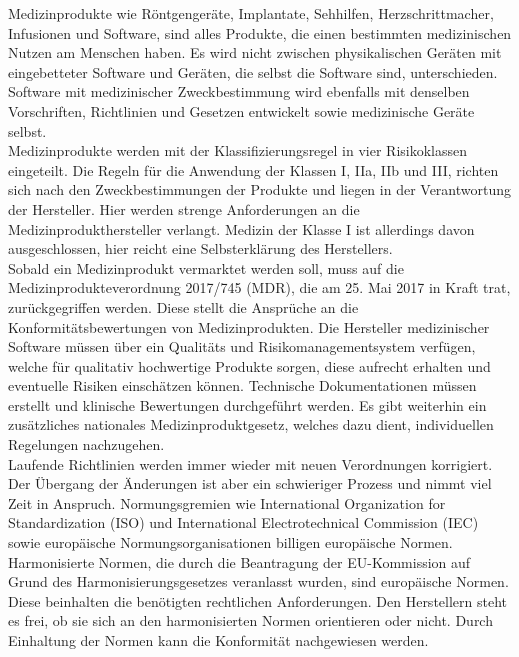 Medizinprodukte wie Röntgengeräte, Implantate, Sehhilfen, Herzschrittmacher, 
Infusionen und Software, sind alles Produkte, die einen bestimmten medizinischen Nutzen am Menschen haben.
Es wird nicht zwischen physikalischen Geräten mit eingebetteter Software und Geräten, die selbst die Software sind, unterschieden. 
Software mit medizinischer Zweckbestimmung wird ebenfalls mit denselben Vorschriften, Richtlinien und Gesetzen entwickelt sowie medizinische Geräte selbst.\cite{AI_in_EU}\\
Medizinprodukte werden mit der Klassifizierungsregel in vier Risikoklassen eingeteilt. 
Die Regeln für die Anwendung der Klassen I, IIa, IIb und III, 
richten sich nach den Zweckbestimmungen der Produkte und liegen in der Verantwortung der Hersteller. Hier werden strenge Anforderungen an die Medizinprodukthersteller verlangt. 
Medizin der Klasse I ist allerdings davon ausgeschlossen, hier reicht eine Selbsterklärung des Herstellers.\\
Sobald ein Medizinprodukt vermarktet werden soll, 
muss auf die Medizinprodukteverordnung 2017/745 (MDR), 
die am 25. Mai 2017 in Kraft trat, zurückgegriffen werden. 
Diese stellt die Ansprüche an die Konformitätsbewertungen von Medizinprodukten. 
Die Hersteller medizinischer Software müssen über ein Qualitäts\- und Risikomanagementsystem verfügen, welche für qualitativ hochwertige Produkte sorgen, 
diese aufrecht erhalten und eventuelle Risiken einschätzen können. 
Technische Dokumentationen müssen erstellt und klinische Bewertungen durchgeführt werden. 
Es gibt weiterhin ein zusätzliches nationales Medizinproduktgesetz, 
welches dazu dient, individuellen Regelungen nachzugehen.\cite{AI_in_EU}\\
Laufende Richtlinien werden immer wieder mit neuen Verordnungen korrigiert. 
Der Übergang der Änderungen ist aber ein schwieriger Prozess und nimmt viel Zeit in Anspruch.
Normungsgremien wie International Organization for Standardization (ISO) und International Electrotechnical Commission (IEC) sowie europäische Normungsorganisationen billigen europäische Normen. 
Harmonisierte Normen, die durch die Beantragung der EU-Kommission auf Grund des Harmonisierungsgesetzes veranlasst wurden, 
sind europäische Normen. Diese beinhalten die benötigten rechtlichen Anforderungen. Den Herstellern steht es frei, 
ob sie sich an den harmonisierten Normen orientieren oder nicht. Durch Einhaltung der Normen kann die Konformität nachgewiesen werden.\cite{AI_in_EU}\\
